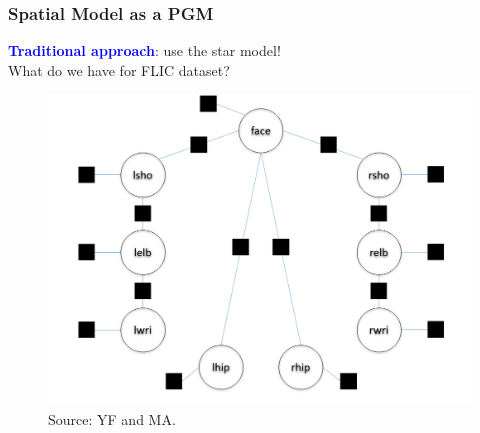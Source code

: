 \documentclass{beamer}
\newcommand\blue[1]{\textcolor{blue}{\textbf{#1}}}
\begin{document}
	\begin{frame}[t]
        \frametitle{Spatial Model as a PGM}
        \begin{center}
			\blue{Traditional approach}: use the star model!\\
			What do we have for FLIC dataset?
            \begin{figure}[htbp] %
            \includegraphics[scale=0.28]{star_model.png} \\
            \scriptsize Source: YF and MA.
            \end{figure}
        \end{center}
    \end{frame}
    
    
    
\end{document}
